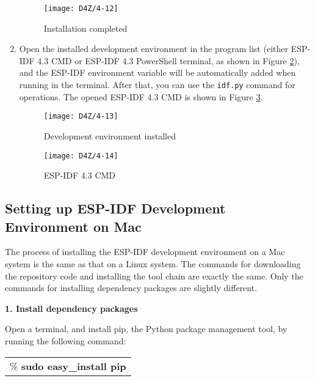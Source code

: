 \documentclass[a4paper,12pt]{book}
\begin{document}
\begin{enumerate}[label=(\arabic*)]
    \begin{figure}[h!]
        \centering
        \texttt{[image: D4Z/4-12]}
        \caption{Installation completed}
        \label{Installation completed}
    \end{figure}

    \item Open the installed development environment in the program list (either ESP-IDF 4.3 CMD or ESP-IDF 4.3 PowerShell terminal, as shown in Figure \ref{Development environment installed}), and the ESP-IDF environment variable will be automatically added when running in the terminal. After that, you can use the \verb|idf.py| command for operations. The opened ESP-IDF 4.3 CMD is shown in Figure \ref{ESP-IDF 4.3 CMD}.

    \begin{figure}[h!]
        \centering
        \texttt{[image: D4Z/4-13]}
        \caption{Development environment installed}
        \label{Development environment installed}
    \end{figure}

    \begin{figure}[h!]
        \centering
        \texttt{[image: D4Z/4-14]}
        \caption{ESP-IDF 4.3 CMD}
        \label{ESP-IDF 4.3 CMD}
    \end{figure}
\end{enumerate}

\subsection{Setting up ESP-IDF Development Environment on Mac}
The process of installing the ESP-IDF development environment on a Mac system is the same as that on a Linux system. The commands for downloading the repository code and installing the tool chain are exactly the same. Only the commands for installing dependency packages are slightly different.

\textbf{1. Install dependency packages}

Open a terminal, and install pip, the Python package management tool, by running the following command:

\begin{codebloc}
\begin{tabular}{d}
\% \textbf{sudo easy\_install pip}
\end{tabular}
\end{codebloc}
\end{document}
